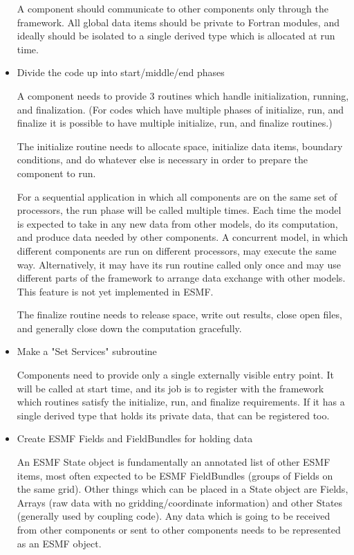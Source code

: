 \begin{itemize}
A component should communicate to other components only through the
framework.  All global data items should be private to Fortran modules,
and ideally should be isolated to a single derived type which is allocated
at run time.   

\item Divide the code up into start/middle/end phases 

A component needs to provide 3 routines which handle
initialization, running, and finalization.  (For codes which have
multiple phases of initialize, run, and finalize it is possible to have
multiple initialize, run, and finalize routines.)

The initialize routine needs to allocate space, initialize
data items, boundary conditions, and do whatever else is necessary in
order to prepare the component to run.

For a sequential application in which all components are on the same
set of processors, the run phase will
be called multiple times.  Each time the model is expected to take in
any new data from other models, do its computation, and produce data
needed by other components.   A concurrent model, in which different
components are run on different processors, may execute the same 
way.  Alternatively, it may have its run routine called
only once and may use different parts of the framework to arrange
data exchange with other models.  This feature is not yet implemented
in ESMF.

The finalize routine needs to release space, write out results,
close open files, and generally close down the computation gracefully.

\item Make a "Set Services" subroutine 

Components need to provide only a single externally visible entry point.
It will be called at start time, and its job is to register with the
framework which routines satisfy the initialize, run, and finalize
requirements.  If it has a single derived type that holds its private data,
that can be registered too.

\item Create ESMF Fields and FieldBundles for holding data

An ESMF State object is fundamentally an annotated list of other
ESMF items, most often expected to be ESMF FieldBundles (groups of
Fields on the same grid).  Other things which can be placed in a 
State object are Fields, Arrays (raw data with no gridding/coordinate 
information)
and other States (generally used by coupling code).  Any data which is
going to be received from other components or sent to other components
needs to be represented as an ESMF object.


\end{itemize}
